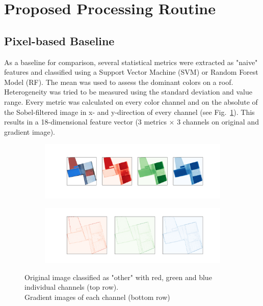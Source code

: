 \documentclass[11pt]{article}
\begin{document}
	
	\section{Proposed Processing Routine}
	
	\subsection{Pixel-based Baseline} 
	\label{sec:pixel_based}
	As a baseline for comparison, several statistical metrics were extracted as "naive" features and classified using a Support Vector Machine (SVM) or Random Forest Model (RF). The mean was used to assess the dominant colors on a roof. Heterogeneity was tried to be measured using the standard deviation and value range. Every metric was calculated on every color channel and on the absolute of the Sobel-filtered image in x- and y-direction of every channel (see Fig.~\ref{fig:pixel_based}). This results in a 18-dimensional feature vector (3 metrics $\times$ 3 channels on original and gradient image).
	
	\begin{figure}
		\centering
		\begin{subfigure}[t]{\textwidth}
			\centering
			\includegraphics[width=\textwidth, trim={3cm 3cm 3cm 3cm},clip]{figures/pixel_based/rgb_channels.png}
		\end{subfigure}
		\begin{subfigure}[b]{.8\textwidth}
			\includegraphics[width=.95\textwidth, trim={2cm 1.5cm 2cm 1.5cm},clip]{figures/pixel_based/sobel.png}
		\end{subfigure}
		\caption{Original image classified as "other" with red, green and blue individual channels (top row). \\ Gradient images of each channel (bottom row)}
		\label{fig:pixel_based}
	\end{figure}
	
\end{document}
